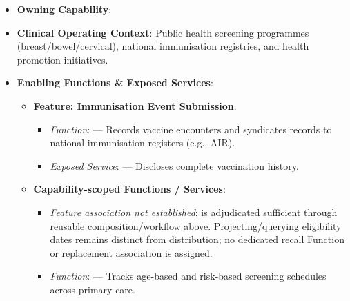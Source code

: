 \begin{itemize}

\item
\textbf{Owning Capability}: \texttt{}



\item
\textbf{Clinical Operating Context}: Public health screening programmes (breast/\allowbreak{}bowel/\allowbreak{}cervical), national immunisation registries, and health promotion initiatives.



\item
\textbf{Enabling Functions \& Exposed Services}:


\begin{itemize}

\item
\textbf{Feature: Immunisation Event Submission}:


\begin{itemize}

\item
\emph{Function}: \texttt{} — Records vaccine encounters and syndicates records to national immunisation registers (e.g., AIR).



\item
\emph{Exposed Service}: \texttt{} — Discloses complete vaccination history.



\end{itemize}


\item
\textbf{Capability-scoped Functions /\allowbreak{} Services}:


\begin{itemize}

\item
\emph{Feature association not established}: \texttt{} is adjudicated sufficient through reusable composition/\allowbreak{}workflow above. Projecting/\allowbreak{}querying eligibility dates remains distinct from distribution; no dedicated recall Function or replacement association is assigned.



\item
\emph{Function}: \texttt{} — Tracks age-based and risk-based screening schedules across primary care.




\end{itemize}
\end{itemize}
\end{itemize}
